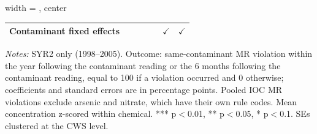 \begin{table}[htbp]
\begin{adjustbox}{width = \textwidth, center}
\begin{tabular}{lrrrrrr}
      Contaminant fixed effects  &                   &                     &                   &                     & $\checkmark$      & $\checkmark$\\   
      \bottomrule
   \end{tabular}
\end{adjustbox}
{\tiny\linespread{1}\selectfont \par \raggedright \textit{Notes:} SYR2 only (1998--2005). Outcome: same-contaminant MR violation within the year following the contaminant reading or the 6 months following the contaminant reading, equal to 100 if a violation occurred and 0 otherwise; coefficients and standard errors are in percentage points. Pooled IOC MR violations exclude arsenic and nitrate, which have their own rule codes. Mean concentration z-scored within chemical. *** p$<$0.01, ** p$<$0.05, * p$<$0.1. SEs clustered at the CWS level.}
\end{table}
